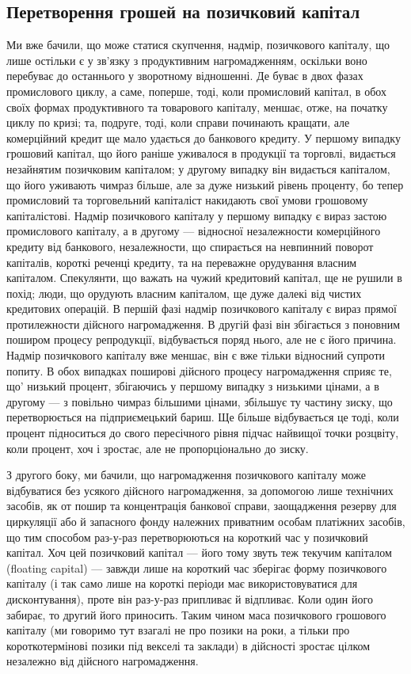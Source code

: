 
\subsection{Перетворення грошей на позичковий капітал}

Ми вже бачили, що може статися скупчення, надмір, позичкового капіталу,
що лише остільки є у зв’язку з продуктивним нагромадженням, оскільки воно
перебуває до останнього у зворотному відношенні. Де буває в двох фазах
промислового циклу, а саме, поперше, тоді, коли промисловий капітал, в обох
своїх формах продуктивного та товарового капіталу, меншає, отже, на початку
циклу по кризі; та, подруге, тоді, коли справи починають кращати,
але комерційний кредит ще мало удається до банкового кредиту. У першому
випадку грошовий капітал, що його раніше уживалося в продукції та торговлі,
видається незайнятим позичковим капіталом; у другому випадку він
видається капіталом, що його уживають чимраз більше, але за дуже низький
рівень проценту, бо тепер промисловий та торговельний капіталіст накидають
свої умови грошовому капіталістові. Надмір позичкового капіталу у першому
випадку є вираз застою промислового капіталу, а в другому — відносної
незалежности комерційного кредиту від банкового, незалежности, що спирається
на невпинний поворот капіталів, короткі реченці кредиту, та на переважне
орудування власним капіталом. Спекулянти, що важать на чужий кредитовий
капітал, ще не рушили в похід; люди, що орудують власним капіталом,
ще дуже далекі від чистих кредитових операцій. В першій фазі надмір позичкового
капіталу є вираз прямої протилежности дійсного нагромадження. В другій
фазі він збігається з поновним поширом процесу репродукції, відбувається поряд
нього, але не є його причина. Надмір позичкового капіталу вже меншає, він є
вже тільки відносний супроти попиту. В обох випадках поширові дійсного процесу
нагромадження сприяє те, що' низький процент, збігаючись у першому
випадку з низькими цінами, а в другому — з повільно чимраз більшими цінами,
збільшує ту частину зиску, що перетворюється на підприємецький бариш. Ще
більше відбувається це тоді, коли процент підноситься до свого пересічного рівня
підчас найвищої точки розцвіту, коли процент, хоч і зростає, але не пропорціонально
до зиску.

З другого боку, ми бачили, що нагромадження позичкового капіталу може
відбуватися без усякого дійсного нагромадження, за допомогою лише технічних
засобів, як от пошир та концентрація банкової справи, заощадження резерву
для циркуляції або й запасного фонду належних приватним особам платіжних засобів,
що тим способом раз-у-раз перетворюються на короткий час у позичковий
капітал. Хоч цей позичковий капітал — його тому звуть теж текучим капіталом
(floating capital) — завжди лише на короткий час зберігає форму позичкового капіталу
(і так само лише на короткі періоди має використовуватися для дисконтування),
проте він раз-у-раз припливає й відпливає. Коли один його забирає, то другий його
приносить. Таким чином маса позичкового грошового капіталу (ми говоримо тут
взагалі не про позики на роки, а тільки про короткотермінові позики під векселі
та заклади) в дійсності зростає цілком незалежно від дійсного нагромадження.

